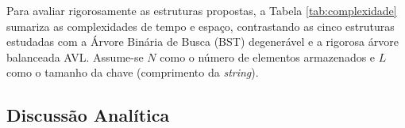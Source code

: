 \documentclass[conference]{IEEEtran}
\begin{document}
Para avaliar rigorosamente as estruturas propostas, a Tabela \ref{tab:complexidade} sumariza as complexidades de tempo e espaço, contrastando as cinco estruturas estudadas com a Árvore Binária de Busca (BST) degenerável e a rigorosa árvore balanceada AVL. Assume-se $N$ como o número de elementos armazenados e $L$ como o tamanho da chave (comprimento da \textit{string}).

\begin{table}[htbp]
\caption{Complexidade Assintótica de Tempo e Espaço}
\begin{center}
\label{tab:complexidade}
\end{center}
\end{table}

\subsection{Discussão Analítica}
\end{document}

